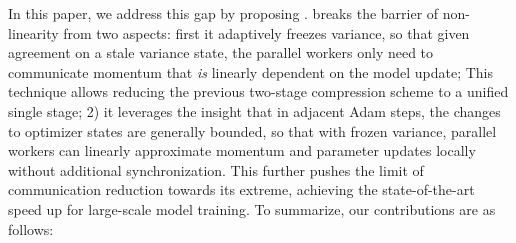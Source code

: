 In this paper, we address this gap by proposing {\myalgo}. {\myalgo} breaks the barrier of non-linearity from two aspects: first it adaptively freezes variance, so that given agreement on a stale variance state, the parallel workers only need to communicate momentum that \emph{is} linearly dependent on the model update; This technique allows reducing the previous two-stage compression scheme to a unified single stage;  2) it leverages the insight that in adjacent Adam steps, the changes to optimizer states are generally bounded, so that with frozen variance, parallel workers can linearly approximate momentum and parameter updates locally without additional synchronization. This further pushes the limit of communication reduction towards its extreme, achieving the state-of-the-art speed up for large-scale model training.   
To summarize, our contributions are as follows:
